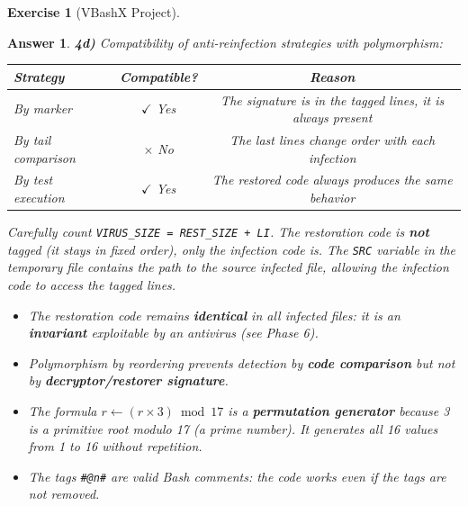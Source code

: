 \documentclass[a4paper,11pt]{article}
\theoremstyle{plain}
\newtheorem{correction}{Answer}
\theoremstyle{definition}
\newtheorem{exercice}{Exercise}
\begin{document}
\begin{exercice}[VBashX Project]
\begin{correction}
\textbf{4d)} Compatibility of anti-reinfection strategies with polymorphism:
\begin{center}
\begin{tabular}{lcc}
\toprule
\textbf{Strategy} & \textbf{Compatible?} & \textbf{Reason} \\
\midrule
By marker & $\checkmark$ Yes & The signature is in the tagged lines, it is always present \\
By tail comparison & $\times$ No & The last lines change order with each infection \\
By test execution & $\checkmark$ Yes & The restored code always produces the same behavior \\
\bottomrule
\end{tabular}
\end{center}

\begin{attention}
Carefully count \texttt{VIRUS\_SIZE = REST\_SIZE + LI}. The restoration code is \textbf{not} tagged (it stays in fixed order), only the infection code is. The \texttt{SRC} variable in the temporary file contains the path to the source infected file, allowing the infection code to access the tagged lines.
\end{attention}

\begin{pointcle}
\begin{itemize}
    \item The restoration code remains \textbf{identical} in all infected files: it is an \textbf{invariant} exploitable by an antivirus (see Phase 6).
    \item Polymorphism by reordering prevents detection by \textbf{code comparison} but not by \textbf{decryptor/restorer signature}.
    \item The formula $r \leftarrow (r \times 3) \bmod 17$ is a \textbf{permutation generator} because 3 is a primitive root modulo 17 (a prime number). It generates all 16 values from 1 to 16 without repetition.
    \item The tags \texttt{\#@n\#} are valid Bash comments: the code works even if the tags are not removed.
\end{itemize}
\end{pointcle}

\end{correction}




\end{exercice}
\end{document}
